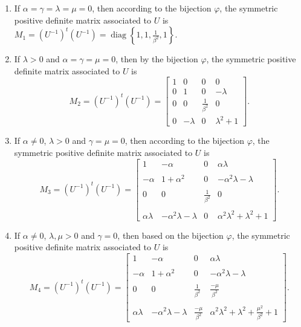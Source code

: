 \documentclass[12pt,a4paper,twoside]{article}
\theoremstyle{definition}
\begin{document}
\begin{enumerate}
\item If $\alpha = \gamma = \lambda = \mu = 0$, then according to the bijection $\varphi$, the symmetric positive definite matrix associated to $U$ is $M_1 = (U^{-1})^t(U^{-1}) = \operatorname{diag}\left\lbrace 1, 1, \frac{1}{\beta^2}, 1\right\rbrace$.
\item If $\lambda > 0$ and $\alpha = \gamma = \mu = 0$, then by the bijection $\varphi$, the symmetric positive definite matrix associated to $U$ is
$$M_2 = (U^{-1})^t(U^{-1}) = \begin{bmatrix}
1 & 0 & 0 & 0\\
0 & 1 & 0 & -\lambda\\
0 & 0 & \frac{1}{\beta^2} & 0\\
0 & -\lambda & 0 & \lambda^2 + 1
\end{bmatrix}.$$
\item If $\alpha \neq 0$, $\lambda > 0$ and $\gamma = \mu = 0$, then according to the bijection $\varphi$, the symmetric positive definite matrix associated to $U$ is 
$$M_3 = (U^{-1})^t(U^{-1}) = \begin{bmatrix}
1 & -\alpha & 0 & \alpha\lambda\\
\\
-\alpha & 1 + \alpha^2 & 0 & -\alpha^2\lambda - \lambda\\
\\
0 & 0 & \frac{1}{\beta^2} & 0\\
\\
\alpha\lambda & -\alpha^2\lambda - \lambda & 0 & \alpha^2\lambda^2+ \lambda^2 + 1
\end{bmatrix}.$$
\item If $\alpha \neq 0$, $\lambda, \mu > 0$ and $\gamma = 0$, then based on the bijection $\varphi$, the symmetric positive definite matrix associated to $U$ is 
$$M_4 = (U^{-1})^t(U^{-1}) = \begin{bmatrix}
1 & -\alpha & 0 & \alpha\lambda\\
\\
-\alpha & 1 + \alpha^2 & 0 & -\alpha^2\lambda - \lambda\\
\\
0 & 0 & \frac{1}{\beta^2} & \frac{-\mu}{\beta^2}\\
\\
\alpha\lambda & -\alpha^2\lambda - \lambda & \frac{-\mu}{\beta^2} & \alpha^2\lambda^2+ \lambda^2 + \frac{\mu^2}{\beta^2} + 1
\end{bmatrix}.$$
\end{enumerate}
\end{document}
